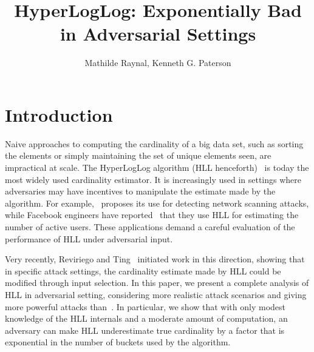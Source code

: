 \documentclass{IEEEtran}
\title{HyperLogLog: Exponentially Bad in Adversarial Settings}
\author{Mathilde Raynal, Kenneth G. Paterson}
\begin{document}
\maketitle


\IEEEdisplaynontitleabstractindextext

\section{Introduction}
Naive approaches to computing the cardinality of a big data set, such as sorting the elements or simply maintaining the set of unique elements seen, are impractical at scale. The HyperLogLog algorithm (HLL henceforth)~\cite{loglog,hll2} is today the most widely used cardinality estimator. It is increasingly used in settings where adversaries may have  incentives to manipulate the estimate made by the algorithm. For example,~\cite{portscanhll} proposes its use for detecting network scanning attacks, while Facebook engineers have reported~\cite{fbhll} that they use HLL for estimating the number of active users. These applications demand a careful evaluation of the performance of HLL under adversarial input. 

Very recently, Reviriego and Ting~\cite{hllvuln} initiated work in this direction, showing that in specific attack settings, the cardinality estimate made by HLL could be modified through input selection. In this paper, we present a complete analysis of HLL in adversarial setting, considering more realistic attack scenarios and giving more powerful attacks than~\cite{hllvuln}. In particular, we show that with only modest knowledge of the HLL internals and a moderate amount of computation, an adversary can make HLL underestimate true cardinality by a factor that is exponential in the number of buckets used by the algorithm.
\end{document}
